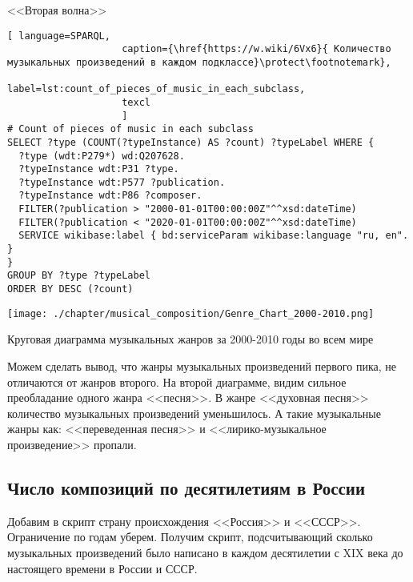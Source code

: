 <<Вторая волна>>

\begin{lstlisting}[ language=SPARQL,
                    caption={\href{https://w.wiki/6Vx6}{ Количество музыкальных произведений в каждом подклассе}\protect\footnotemark},
                    label=lst:count_of_pieces_of_music_in_each_subclass,
                    texcl 
                    ]
# Count of pieces of music in each subclass
SELECT ?type (COUNT(?typeInstance) AS ?count) ?typeLabel WHERE {
  ?type (wdt:P279*) wd:Q207628.
  ?typeInstance wdt:P31 ?type.
  ?typeInstance wdt:P577 ?publication.
  ?typeInstance wdt:P86 ?composer.
  FILTER(?publication > "2000-01-01T00:00:00Z"^^xsd:dateTime)        
  FILTER(?publication < "2020-01-01T00:00:00Z"^^xsd:dateTime)
  SERVICE wikibase:label { bd:serviceParam wikibase:language "ru, en". }
}
GROUP BY ?type ?typeLabel
ORDER BY DESC (?count)
\end{lstlisting}%

\begin{marginfigure}[0\baselineskip]
	\texttt{[image: ./chapter/musical\_composition/Genre\_Chart\_2000-2010.png]}
	\caption[Круговая диаграмма музыкальных жанров за 2000-2010 годы во всем мире]{Круговая диаграмма музыкальных жанров за 2000-2010 годы во всем мире}%
\end{marginfigure}

Можем сделать вывод, что жанры музыкальных произведений первого пика, не отличаются от жанров второго. На второй диаграмме, видим сильное преобладание одного жанра <<песня>>. В жанре <<духовная песня>> количество музыкальных произведений уменьшилось. А такие музыкальные жанры как: <<переведенная песня>> и <<лирико-музыкальное произведение>> пропали.

\subsection{Число композиций по десятилетиям в России}
Добавим в скрипт страну происхождения <<Россия>> и <<СССР>>. Ограничение по годам уберем. Получим скрипт, подсчитывающий сколько музыкальных произведений было написано в каждом десятилетии с XIX века до настоящего времени в России и СССР.

